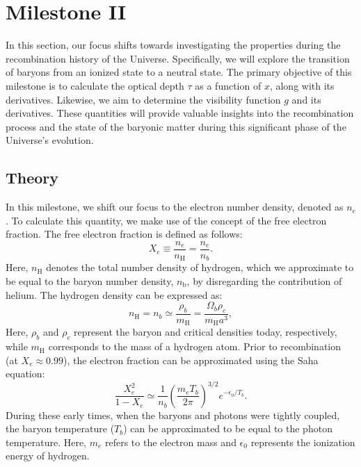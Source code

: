 \documentclass{aa}
\begin{document}
\section{Milestone II}\label{section:M2}
In this section, our focus shifts towards investigating the properties during the recombination history of the Universe. Specifically, we will explore the transition of baryons from an ionized state to a neutral state. The primary objective of this milestone is to calculate the optical depth $\tau$ as a function of $x$, along with its derivatives. Likewise, we aim to determine the visibility function $g$ and its derivatives. These quantities will provide valuable insights into the recombination process and the state of the baryonic matter during this significant phase of the Universe's evolution.


\subsection{Theory}
In this milestone, we shift our focus to the electron number density, denoted as $n_e$. To calculate this quantity, we make use of the concept of the free electron fraction. The free electron fraction is defined as follows:
\begin{equation}\label{eq: X_e}
    X_{e} \equiv \frac{n_{e}}{n_{\mathrm{H}}}=\frac{n_{e}}{n_{b}}.
\end{equation}
Here, $n_{\mathrm{H}}$ denotes the total number density of hydrogen, which we approximate to be equal to the baryon number density, $n_{\mathrm{b}}$, by disregarding the contribution of helium. The hydrogen density can be expressed as:
\begin{equation}\label{eq: n_e}
    n_{\mathrm{H}}=n_{b} \simeq
    \frac{\rho_{b}}{m_{\mathrm{H}}}=\frac{\Omega_{b} \rho_{c}}{m_{\mathrm{H}}
    a^{3}},
\end{equation}
Here, $\rho_b$ and $\rho_c$ represent the baryon and critical densities today, respectively, while $m_\mathrm{H}$ corresponds to the mass of a hydrogen atom. Prior to recombination (at $X_e \approx 0.99$), the electron fraction can be approximated using the Saha equation:
\begin{equation}\label{eq: saha}
    \frac{X_{e}^{2}}{1-X_{e}} \simeq \frac{1}{n_{b}}\left(\frac{m_{e} T_{b}}{2
    \pi}\right)^{3 / 2} e^{-\epsilon_{0} / T_{b}}.
\end{equation}
During these early times, when the baryons and photons were tightly coupled, the baryon temperature ($T_b$) can be approximated to be equal to the photon temperature. Here, $m_e$ refers to the electron mass and $\epsilon_0$ represents the ionization energy of hydrogen.
\end{document}
